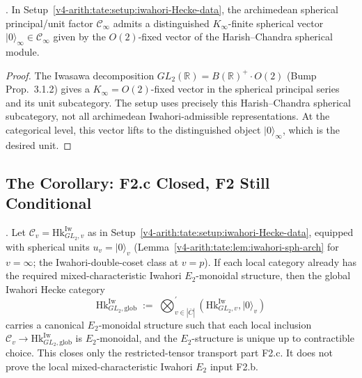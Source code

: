 \begin{lemma}
\label{v4-arith:tate:lem:iwahori-sph-arch}
\ClaimStatusProvedHere. In
Setup~\ref{v4-arith:tate:setup:iwahori-Hecke-data}, the archimedean
spherical principal/unit factor \(\mathcal{C}_{\infty}\) admits a
distinguished \(K_{\infty}\)-finite spherical vector
\(|0\rangle_{\infty}\in\mathcal{C}_{\infty}\) given by the
\(O(2)\)-fixed vector of the Harish--Chandra spherical module.
\end{lemma}

\begin{proof}
The Iwasawa decomposition
\(GL_{2}(\mathbb{R})=B(\mathbb{R})^{+}\cdot O(2)\) (Bump
Prop.~3.1.2) gives a \(K_{\infty}=O(2)\)-fixed vector in the spherical
principal series and its unit subcategory. The setup uses precisely
this Harish--Chandra spherical subcategory, not all archimedean
Iwahori-admissible representations. At the categorical level, this
vector lifts to the distinguished object \(|0\rangle_{\infty}\), which
is the desired unit.
\end{proof}

\subsection{The Corollary: F2.c Closed, F2 Still Conditional}

\begin{corollary}
\label{v4-arith:tate:cor:F2-closed}
\ClaimStatusProvedHere. Let
\(\mathcal{C}_{v}=\mathrm{Hk}^{\mathrm{Iw}}_{GL_{2},v}\) as in
Setup~\ref{v4-arith:tate:setup:iwahori-Hecke-data}, equipped with
spherical units \(u_{v}=|0\rangle_{v}\) (Lemma~\ref{v4-arith:tate:lem:iwahori-sph-arch}
for \(v=\infty\); the Iwahori-double-coset class at \(v=p\)). If each
local category already has the required mixed-characteristic
Iwahori \(E_{2}\)-monoidal structure, then the
global Iwahori Hecke category
\[
\mathrm{Hk}^{\mathrm{Iw}}_{GL_{2},\mathrm{glob}}\;:=\;\bigotimes_{v\in|\overline{C}|}^{\prime}(\mathrm{Hk}^{\mathrm{Iw}}_{GL_{2},v},|0\rangle_{v})
\]
carries a canonical \(E_{2}\)-monoidal structure such that each
local inclusion \(\mathcal{C}_{v}\to\mathrm{Hk}^{\mathrm{Iw}}_{GL_{2},\mathrm{glob}}\)
is \(E_{2}\)-monoidal, and the \(E_{2}\)-structure is unique up to
contractible choice. This closes only the restricted-tensor
transport part F2.c. It does not prove the local
mixed-characteristic Iwahori \(E_{2}\) input F2.b.
\end{corollary}

